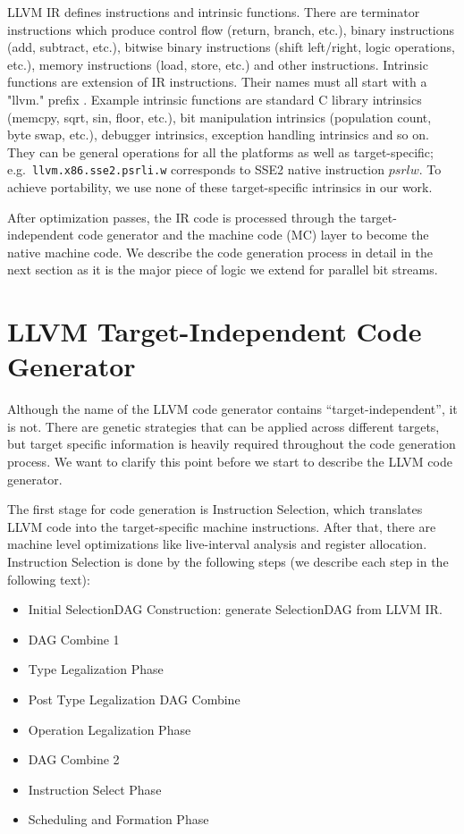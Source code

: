 LLVM IR defines instructions and intrinsic functions. There are terminator instructions which produce control flow (return, branch, etc.), binary instructions (add, subtract, etc.), bitwise binary instructions (shift left/right, logic operations, etc.), memory instructions (load, store, etc.) and other instructions. Intrinsic functions are extension of IR instructions. Their names must all start with a "llvm." prefix \cite{llvm_lang_ref}. Example intrinsic functions are standard C library intrinsics (memcpy, sqrt, sin, floor, etc.), bit manipulation intrinsics (population count, byte swap, etc.), debugger intrinsics, exception handling intrinsics and so on. They can be general operations for all the platforms as well as target-specific; e.g.\ {\tt llvm.x86.sse2.psrli.w} corresponds to SSE2 native instruction $psrlw$. To achieve portability, we use none of these target-specific intrinsics in our work.

After optimization passes, the IR code is processed through the target-independent code generator and the machine code (MC) layer to become the native machine code. We describe the code generation process in detail in the next section as it is the major piece of logic we extend for parallel bit streams.

\section{LLVM Target-Independent Code Generator}
Although the name of the LLVM code generator contains ``target-independent'', it is not. There are genetic strategies that can be applied across different targets, but target specific information is heavily required throughout the code generation process. We want to clarify this point before we start to describe the LLVM code generator.

The first stage for code generation is Instruction Selection, which translates LLVM code into the target-specific machine instructions. After that, there are machine level optimizations like live-interval analysis and register allocation. Instruction Selection is done by the following steps \cite{llvm_code_gen} (we describe each step in the following text):

\begin{itemize}
  \item Initial SelectionDAG Construction: generate SelectionDAG from LLVM IR.
  \item DAG Combine 1
  \item Type Legalization Phase
  \item Post Type Legalization DAG Combine
  \item Operation Legalization Phase
  \item DAG Combine 2
  \item Instruction Select Phase
  \item Scheduling and Formation Phase
\end{itemize}

